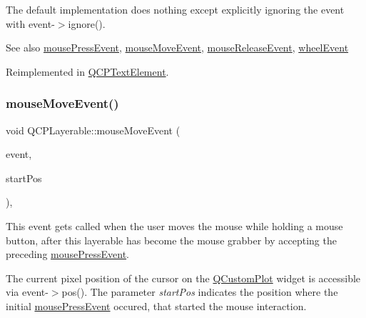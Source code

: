 The default implementation does nothing except explicitly ignoring the event with {\ttfamily event-\/$>$ignore()}.

\begin{DoxySeeAlso}{See also}
\mbox{\hyperlink{class_q_c_p_layerable_af6567604818db90f4fd52822f8bc8376}{mouse\+Press\+Event}}, \mbox{\hyperlink{class_q_c_p_layerable_a9eee1ba47fd69be111059ca3881933e4}{mouse\+Move\+Event}}, \mbox{\hyperlink{class_q_c_p_layerable_aa0d79b005686f668622bbe66ac03ba2c}{mouse\+Release\+Event}}, \mbox{\hyperlink{class_q_c_p_layerable_a47dfd7b8fd99c08ca54e09c362b6f022}{wheel\+Event}} 
\end{DoxySeeAlso}


Reimplemented in \mbox{\hyperlink{class_q_c_p_text_element_a2272ff775ab385f612e9fd39773de7c0}{Q\+C\+P\+Text\+Element}}.

\mbox{\label{class_q_c_p_layerable_a9eee1ba47fd69be111059ca3881933e4}} 
\subsubsection{\texorpdfstring{mouse\+Move\+Event()}{mouseMoveEvent()}}
{\footnotesize\ttfamily void Q\+C\+P\+Layerable\+::mouse\+Move\+Event (\begin{DoxyParamCaption}\item[{Q\+Mouse\+Event $\ast$}]{event,  }\item[{const Q\+PointF \&}]{start\+Pos }\end{DoxyParamCaption})\hspace{0.3cm}{\ttfamily [protected]}, {\ttfamily [virtual]}}

This event gets called when the user moves the mouse while holding a mouse button, after this layerable has become the mouse grabber by accepting the preceding \mbox{\hyperlink{class_q_c_p_layerable_af6567604818db90f4fd52822f8bc8376}{mouse\+Press\+Event}}.

The current pixel position of the cursor on the \mbox{\hyperlink{class_q_custom_plot}{Q\+Custom\+Plot}} widget is accessible via {\ttfamily event-\/$>$pos()}. The parameter {\itshape start\+Pos} indicates the position where the initial \mbox{\hyperlink{class_q_c_p_layerable_af6567604818db90f4fd52822f8bc8376}{mouse\+Press\+Event}} occured, that started the mouse interaction.

